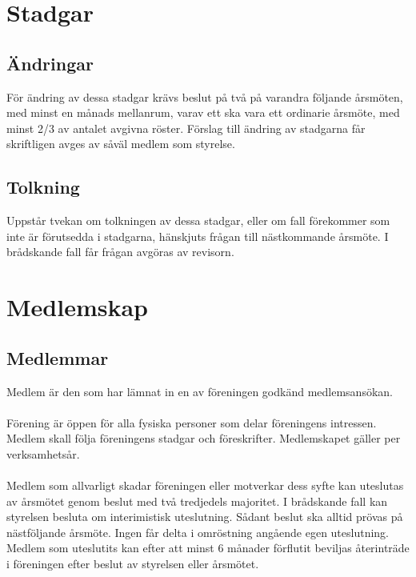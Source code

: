 \documentclass[a4paper,11pt]{article}
\begin{document}
\section{Stadgar}
\subsection{Ändringar}
För ändring av dessa stadgar krävs beslut på två på varandra följande årsmöten, med minst en månads mellanrum, varav ett ska vara ett ordinarie årsmöte, med minst 2/3 av antalet avgivna röster. Förslag till ändring av stadgarna får skriftligen avges av såväl medlem som styrelse.

\subsection{Tolkning}
Uppstår tvekan om tolkningen av dessa stadgar, eller om fall förekommer som inte är förutsedda i stadgarna, hänskjuts frågan till nästkommande årsmöte. I brådskande fall får frågan avgöras av revisorn. 


\section{Medlemskap}

\subsection{Medlemmar}

Medlem är den som har lämnat in en av föreningen godkänd medlemsansökan. 
\paragraph{}
Förening är öppen för alla fysiska personer som delar föreningens intressen. Medlem skall följa föreningens stadgar och föreskrifter. Medlemskapet gäller per verksamhetsår. 
\paragraph{}
Medlem som allvarligt skadar föreningen eller motverkar dess syfte kan uteslutas av årsmötet genom beslut med två tredjedels majoritet. I brådskande fall kan styrelsen besluta om interimistisk uteslutning. Sådant beslut ska alltid prövas på nästföljande årsmöte. Ingen får delta i omröstning angående egen uteslutning. Medlem som uteslutits kan efter att minst 6 månader förflutit beviljas återinträde i föreningen efter beslut av styrelsen eller årsmötet.
\end{document}
